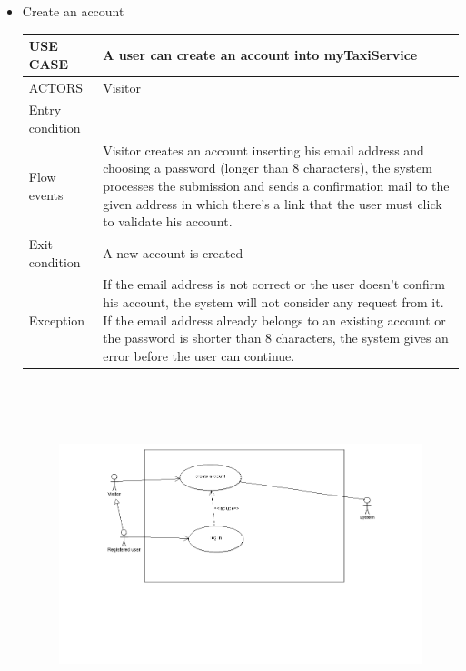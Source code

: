\begin{itemize}
\item Create an account
\begin{center}
    \begin{tabular}{ | l | p{11cm} |}
    \hline
   USE CASE & A user can create an account into myTaxiService \\ \hline
    ACTORS & Visitor \\ \hline
     Entry condition &  \\ \hline
     Flow events & Visitor creates an account inserting his email address and choosing a password (longer than 8 characters), the system processes the submission and sends a confirmation mail to the given address in which there’s a link that the user must click to validate his account. \\ \hline
     Exit condition & A new account is created \\ \hline
     Exception &  If the email address is not correct or the user doesn’t confirm his account, the system will not consider any request from it. If the email address already belongs to an existing account or the password is shorter than 8 characters, the system gives an error before the user can continue.\\ \hline
    \end{tabular}
\end{center}
\begin{center}
\begin{figure} [h]
    \includegraphics [width=15cm, height=10cm]{register1.png}
\end{figure}
\end{center}
\newpage 
\end{itemize}






